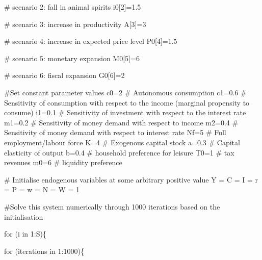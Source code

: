 \documentclass[
  letterpaper,
  DIV=11,
  numbers=noendperiod]{scrreprt}
\newenvironment{Shaded}{\begin{snugshade}}{\end{snugshade}}
\newcommand{\CommentTok}[1]{\textcolor[rgb]{0.37,0.37,0.37}{#1}}
\newcommand{\ControlFlowTok}[1]{\textcolor[rgb]{0.00,0.23,0.31}{#1}}
\newcommand{\DecValTok}[1]{\textcolor[rgb]{0.68,0.00,0.00}{#1}}
\newcommand{\FloatTok}[1]{\textcolor[rgb]{0.68,0.00,0.00}{#1}}
\newcommand{\NormalTok}[1]{\textcolor[rgb]{0.00,0.23,0.31}{#1}}
\newcommand{\OtherTok}[1]{\textcolor[rgb]{0.00,0.23,0.31}{#1}}
\newcommand{\SpecialCharTok}[1]{\textcolor[rgb]{0.37,0.37,0.37}{#1}}
\begin{document}
\begin{Shaded}
\begin{Highlighting}[]
\CommentTok{\# scenario 2: fall in animal spirits}
\NormalTok{i0[}\DecValTok{2}\NormalTok{]}\OtherTok{=}\FloatTok{1.5}

\CommentTok{\# scenario 3: increase in productivity}
\NormalTok{A[}\DecValTok{3}\NormalTok{]}\OtherTok{=}\DecValTok{3}

\CommentTok{\# scenario 4: increase in expected price level}
\NormalTok{P0[}\DecValTok{4}\NormalTok{]}\OtherTok{=}\FloatTok{1.5}  
   
\CommentTok{\# scenario 5: monetary expansion }
\NormalTok{M0[}\DecValTok{5}\NormalTok{]}\OtherTok{=}\DecValTok{6}

\CommentTok{\# scenario 6: fiscal expansion}
\NormalTok{G0[}\DecValTok{6}\NormalTok{]}\OtherTok{=}\DecValTok{2}  
    
\CommentTok{\#Set constant parameter values}
\NormalTok{c0}\OtherTok{=}\DecValTok{2}   \CommentTok{\# Autonomous consumption}
\NormalTok{c1}\OtherTok{=}\FloatTok{0.6} \CommentTok{\# Sensitivity of consumption with respect to the income (marginal propensity to consume)}
\NormalTok{i1}\OtherTok{=}\FloatTok{0.1} \CommentTok{\# Sensitivity of investment with respect to the interest rate}
\NormalTok{m1}\OtherTok{=}\FloatTok{0.2} \CommentTok{\# Sensitivity of money demand with respect to income}
\NormalTok{m2}\OtherTok{=}\FloatTok{0.4} \CommentTok{\# Sensitivity of money demand with respect to interest rate}
\NormalTok{Nf}\OtherTok{=}\DecValTok{5}   \CommentTok{\# Full employment/labour force}
\NormalTok{K}\OtherTok{=}\DecValTok{4}    \CommentTok{\# Exogenous capital stock}
\NormalTok{a}\OtherTok{=}\FloatTok{0.3}  \CommentTok{\# Capital elasticity of output}
\NormalTok{b}\OtherTok{=}\FloatTok{0.4}  \CommentTok{\# household preference for leisure}
\NormalTok{T0}\OtherTok{=}\DecValTok{1}   \CommentTok{\# tax revenues}
\NormalTok{m0}\OtherTok{=}\DecValTok{6}   \CommentTok{\# liquidity preference}

\CommentTok{\# Initialise endogenous variables at some arbitrary positive value }
\NormalTok{Y }\OtherTok{=}\NormalTok{ C }\OtherTok{=}\NormalTok{ I }\OtherTok{=}\NormalTok{ r }\OtherTok{=}\NormalTok{ P }\OtherTok{=}\NormalTok{ w }\OtherTok{=}\NormalTok{ N }\OtherTok{=}\NormalTok{ W }\OtherTok{=} \DecValTok{1}

\CommentTok{\#Solve this system numerically through 1000 iterations based on the initialisation}

\ControlFlowTok{for}\NormalTok{ (i }\ControlFlowTok{in} \DecValTok{1}\SpecialCharTok{:}\NormalTok{S)\{}
  
  \ControlFlowTok{for}\NormalTok{ (iterations }\ControlFlowTok{in} \DecValTok{1}\SpecialCharTok{:}\DecValTok{1000}\NormalTok{)\{}
    

\end{Highlighting}
\end{Shaded}
\end{document}
